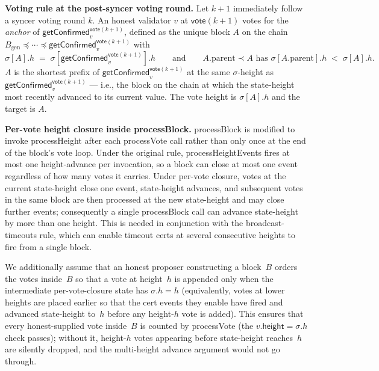 \ifx\litemode\undefined\documentclass{article}\fi
\newcommand{\genesis}{\ensuremath{B_{\mathrm{gen}}}}
\newcommand{\height}{\mathsf{height}}
\newcommand{\processBlock}{\textsf{processBlock}\xspace}
\newcommand{\processHeight}{\textsf{processHeight}\xspace}
\newcommand{\processHeightEvents}{\textsf{processHeightEvents}\xspace}
\newcommand{\processVote}{\textsf{processVote}\xspace}
\newcommand{\vote}{\ensuremath{\mathsf{vote}}}
\newcommand{\getConfirmed}{\textsf{getConfirmed}\xspace}
\renewcommand{\paragraph}[1]{\vspace{7pt}\noindent\textbf{#1}}
\theoremstyle{plain}
\theoremstyle{definition}
\theoremstyle{remark}
\begin{document}
\paragraph{Voting rule at the post-syncer voting round.}
Let $k+1$ immediately follow a syncer voting round $k$. An honest validator $v$ at $\vote(k+1)$ votes for the \emph{anchor} of $\getConfirmed_v^{\vote(k+1)}$, defined as the unique block $A$ on the chain $\genesis \preceq \cdots \preceq \getConfirmed_v^{\vote(k+1)}$ with
\[
  \sigma[A].h \;=\; \sigma[\getConfirmed_v^{\vote(k+1)}].h
  \qquad\text{and}\qquad
  A.\mathrm{parent} \prec A \text{ has } \sigma[A.\mathrm{parent}].h \;<\; \sigma[A].h.
\]
$A$ is the shortest prefix of $\getConfirmed_v^{\vote(k+1)}$ at the same $\sigma$-height as $\getConfirmed_v^{\vote(k+1)}$ --- i.e., the block on the chain at which the state-height most recently advanced to its current value.
The vote height is $\sigma[A].h$ and the target is $A$.

\paragraph{Per-vote height closure inside \processBlock{}.}
\processBlock{} is modified to invoke \processHeight{} after each \processVote{} call rather than only once at the end of the block's vote loop. Under the original rule, \processHeightEvents{} fires at most one height-advance per invocation, so a block can close at most one event regardless of how many votes it carries. Under per-vote closure, votes at the current state-height close one event, state-height advances, and subsequent votes in the same block are then processed at the new state-height and may close further events; consequently a single \processBlock{} call can advance state-height by more than one height. This is needed in conjunction with the broadcast-timeouts rule, which can enable timeout certs at several consecutive heights to fire from a single block.

We additionally assume that an honest proposer constructing a block~$B$ orders the votes inside~$B$ so that a vote at height~$h$ is appended only when the intermediate per-vote-closure state has $\sigma.h = h$ (equivalently, votes at lower heights are placed earlier so that the cert events they enable have fired and advanced state-height to~$h$ before any height-$h$ vote is added). This ensures that every honest-supplied vote inside~$B$ is counted by \processVote{} (the $v.\height = \sigma.h$ check passes); without it, height-$h$ votes appearing before state-height reaches~$h$ are silently dropped, and the multi-height advance argument would not go through.
\end{document}
